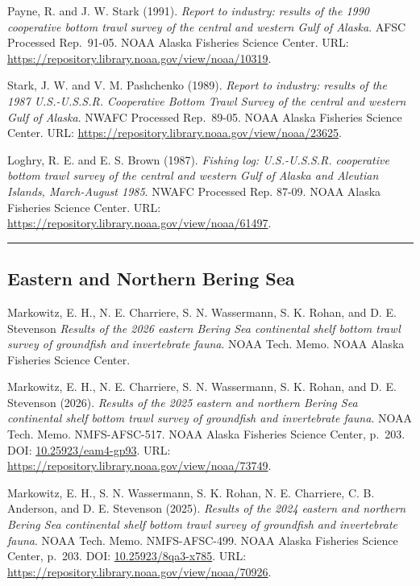 \documentclass[
  letterpaper,
  oneside,
  open=any]{scrbook}
\begin{document}
Payne, R. and J. W. Stark (1991). \emph{Report to industry: results of
the 1990 cooperative bottom trawl survey of the central and western Gulf
of Alaska}. AFSC Processed Rep.~91-05. NOAA Alaska Fisheries Science
Center. URL: \url{https://repository.library.noaa.gov/view/noaa/10319}.

Stark, J. W. and V. M. Pashchenko (1989). \emph{Report to industry:
results of the 1987 U.S.-U.S.S.R. Cooperative Bottom Trawl Survey of the
central and western Gulf of Alaska}. NWAFC Processed Rep.~89-05. NOAA
Alaska Fisheries Science Center. URL:
\url{https://repository.library.noaa.gov/view/noaa/23625}.

Loghry, R. E. and E. S. Brown (1987). \emph{Fishing log: U.S.-U.S.S.R.
cooperative bottom trawl survey of the central and western Gulf of
Alaska and Aleutian Islands, March-August 1985}. NWAFC Processed Rep.
87-09. NOAA Alaska Fisheries Science Center. URL:
\url{https://repository.library.noaa.gov/view/noaa/61497}.

\begin{center}\rule{0.5\linewidth}{0.5pt}\end{center}

\subsection{Eastern and Northern Bering
Sea}\label{eastern-and-northern-bering-sea}

Markowitz, E. H., N. E. Charriere, S. N. Wassermann, S. K. Rohan, and D.
E. Stevenson \emph{Results of the 2026 eastern Bering Sea continental
shelf bottom trawl survey of groundfish and invertebrate fauna}. NOAA
Tech. Memo. NOAA Alaska Fisheries Science Center.

Markowitz, E. H., N. E. Charriere, S. N. Wassermann, S. K. Rohan, and D.
E. Stevenson (2026). \emph{Results of the 2025 eastern and northern
Bering Sea continental shelf bottom trawl survey of groundfish and
invertebrate fauna}. NOAA Tech. Memo. NMFS-AFSC-517. NOAA Alaska
Fisheries Science Center, p.~203. DOI:
\href{https://doi.org/10.25923\%2Feam4-gp93}{10.25923/eam4-gp93}. URL:
\url{https://repository.library.noaa.gov/view/noaa/73749}.

Markowitz, E. H., S. N. Wassermann, S. K. Rohan, N. E. Charriere, C. B.
Anderson, and D. E. Stevenson (2025). \emph{Results of the 2024 eastern
and northern Bering Sea continental shelf bottom trawl survey of
groundfish and invertebrate fauna}. NOAA Tech. Memo. NMFS-AFSC-499. NOAA
Alaska Fisheries Science Center, p.~203. DOI:
\href{https://doi.org/10.25923\%2F8qa3-x785}{10.25923/8qa3-x785}. URL:
\url{https://repository.library.noaa.gov/view/noaa/70926}.
\end{document}
